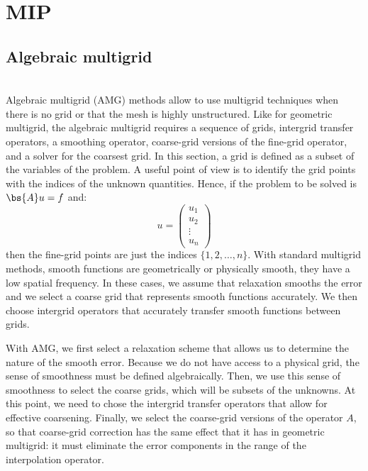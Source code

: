 \chapter{MIP}
\section{Algebraic multigrid}
\\
Algebraic multigrid (AMG) methods allow to use multigrid techniques when there is
no grid or that the mesh is highly unstructured. Like for geometric multigrid,
the algebraic multigrid requires a sequence of grids, intergrid transfer
operators, a smoothing operator, coarse-grid versions of the fine-grid
operator, and a solver for the coarsest grid. In this section, a grid is
defined as a subset of the variables of the problem. A useful point of view is
to identify the grid points with the indices of the unknown quantities. Hence,
if the problem to be solved is $\bs{A}u=f$ and:
\begin{equation}
u=
\begin{pmatrix}
u_1\\
u_2\\
\vdots\\
u_n
\end{pmatrix}
\end{equation}
then the fine-grid points are just the indices $\{1,2,\hdots,n\}$. With
standard multigrid methods, smooth functions are geometrically or
physically smooth, they have a low spatial frequency. In these cases, we
assume that relaxation smooths the error and we select a coarse grid that
represents smooth functions accurately. We then choose intergrid operators
that accurately transfer smooth functions between grids.

With AMG, we first select a relaxation scheme that allows us to determine the
nature of the smooth error. Because we do not have access to a physical grid,
the sense of smoothness must be defined algebraically. Then, we use this sense
of smoothness to select the coarse grids, which will be subsets of the
unknowns. At this point, we need to chose the intergrid transfer operators
that allow for effective coarsening. Finally, we select the coarse-grid
versions of the operator $A$, so that coarse-grid correction has the same
effect that it has in geometric multigrid: it must eliminate the error
components in the range of the interpolation operator.

